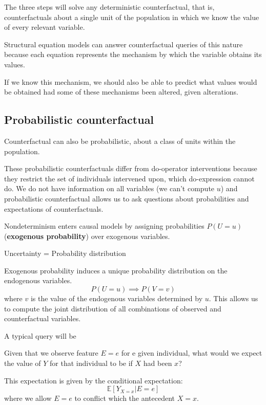 The three steps will solve any deterministic counterfactual, that is, counterfactuals
about a single unit of the population in which we know the value of every relevant variable.

Structural equation models can answer counterfactual queries of this nature
because each equation represents the mechanism by which the variable obtains its
values.

If we know this mechanism, we should also be able to predict what values would
be obtained had some of these mechanisms been altered, given alterations.

\subsection{Probabilistic counterfactual}
Counterfactual can also be probabilistic, about a class of units within the population.

These probabilistic counterfactuals differ from do-operator interventions because
they restrict the set of individuals intervened upon, which do-expression cannot do.
We do not have information on all variables (we can't compute $u$) and probabilistic
counterfactual allows us to ask questions about probabilities and expectations of
counterfactuals.

Nondeterminism enters causal models by assigning probabilities $P(U = u)$
(\textbf{exogenous probability}) over exogenous variables.
\begin{center}
    Uncertainty = Probability distribution
\end{center}

Exogenous probability induces a unique probability distribution on the endogenous
variables.
\begin{equation*}
    P(U = u) \implies P(V = v)
\end{equation*}
where $v$ is the value of the endogenous variables determined by $u$. This allows
us to compute the joint distribution of all combinations of observed and
counterfactual variables.

A typical query will be
\begin{center}
    Given that we observe feature $E = e$ for e given individual, what would we
    expect the value of $Y$ for that individual to be if $X$ had been $x$?
\end{center}
This expectation is given by the conditional expectation:
\begin{equation}
    \mathbb{E}[Y_{X = x} | E = e]
\end{equation}
where we allow $E = e$ to conflict which the antecedent $X = x$.

